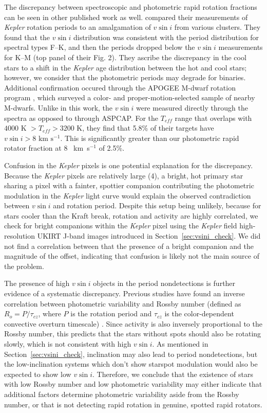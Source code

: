 \documentclass[manuscript]{aastex6}
\newcommand{\vsini}{\ensuremath{v \sin i}}
\newcommand{\Kepler}{\mbox{\textit{Kepler}}}
\newcommand{\Teff}{\ensuremath{T_{eff}}}
\newcommand{\kms}{\textrm{~km~s}\ensuremath{^{-1}}}
\begin{document}
The discrepancy between spectroscopic and 
photometric rapid rotation fractions can be seen in other published work as well. 
\citet{Nielsen13} compared their measurements of \Kepler{} rotation periods to
an amalgamation of \vsini{} from various clusters. They found that the
\vsini{} distribution was consistent with the period distribution for spectral
types F--K, and then the periods dropped below the \vsini{} measurements for
K--M (top panel of their Fig. 2). They ascribe the discrepancy in the cool
stars to a shift in the \Kepler{} age distribution between the hot and cool
stars; however, we consider that the photometric periods may degrade for
binaries.  Additional confirmation occured through the APOGEE M-dwarf rotation
program \citep{Gilhool18}, which surveyed a color- and proper-motion-selected 
sample of nearby M-dwarfs. Unlike in this work, the \vsini{} were measured 
directly through the spectra as opposed to through ASPCAP\@. For the \Teff{} range that
overlaps with \citet{McQuillan14} \(4000 \textrm{ K } > \Teff > 3200\) K, they 
find that 5.8\% of their targets have \(\vsini > 8 \kms\). This is 
significantly greater than our photometric rapid rotator fraction at 8 \kms{} 
of 2.5\%. 

Confusion in the \Kepler{} pixels is one potential explanation for the
discrepancy. Because the \Kepler{} pixels are relatively large (4\arcsec), a 
bright, hot primary star sharing a pixel with a fainter, spottier companion 
contributing the photometric modulation in the
\Kepler{} light curve would explain the observed contradiction between
\vsini{} and rotation period. Despite this setup being unlikely, because for 
stars cooler than the Kraft break, rotation and activity are highly 
correlated, we check for bright companions
within the \Kepler{} pixel using the \Kepler{} field high-resolution UKIRT
J-band images introduced in Section~\ref{sec:vsini_check}. We did not find a 
correlation between that the presence of a bright companion and the magnitude 
of the offset, indicating that confusion is likely not the main source of the 
problem.

The presence of high \vsini{} objects in the period nondetections is
further evidence of a systematic discrepancy. Previous studies have found an 
inverse correlation between photometric variability and Rossby number (defined 
as \(R_o = P / \tau_{cz}\), where \(P\) is the rotation period and 
\(\tau_{cz}\) is the color-dependent convective overturn timescale) 
\citep{Messina01,Hartman09}. Since activity is also inversely
proportional to the Rossby number, this predicts that the stars without
spots should also be rotating slowly, which is not consistent with high
\vsini{}. As mentioned in Section~\ref{sec:vsini_check}, inclination may
also lead to period nondetections, but the low-inclination systems which
don't show starspot modulation would also be expected to show low
\vsini{}. Therefore, we conclude that the existence of 
stars with low Rossby number and low photometric variability may either 
indicate that additional factors determine photometric variability 
aside from the Rossby number, or that \citet{McQuillan14} is not detecting 
rapid rotation in genuine, spotted rapid rotators.
\end{document}
